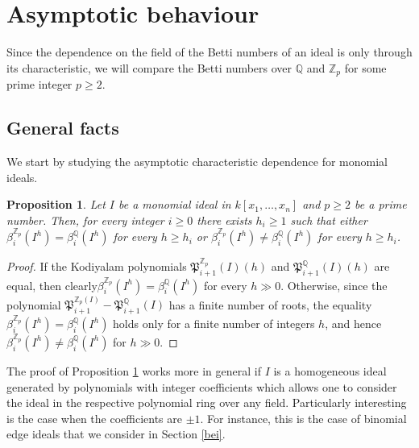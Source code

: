 \documentclass[11pt,oneside]{amsart}
\theoremstyle{plain}
\newtheorem{proposition}[theorem]{Proposition}
\theoremstyle{definition}
\newcommand{\Q}{\mathbb{Q}}
\newcommand{\Z}{\mathbb{Z}}
\newcommand{\mf}{\mathfrak}
\begin{document}
\section{Asymptotic behaviour}\label{S.asymptoticBehaviour}

Since the dependence on the field of the Betti numbers of an ideal is only through its characteristic, we will compare the Betti numbers over $\Q$ and $\Z_p$ for some prime integer $p \geq 2$. 



\subsection{General facts} 
We start by studying the asymptotic characteristic dependence for monomial ideals.

\begin{proposition}\label{P.KodiyalamPolynomials}
Let $I$ be a monomial ideal in $k[x_1,\dots,x_n]$ and $p \geq 2$ be a prime number. Then, for every integer $i \geq 0$ there exists $h_i \geq 1$ such that either $\beta^{\Z_p}_i(I^h)=\beta^{\Q}_i(I^h)$ for every $h\geq h_i$ or $\beta^{\Z_p}_i(I^h) \neq \beta^{\Q}_i(I^h)$ for every $h\geq h_i$.
\end{proposition}

\begin{proof}
If the Kodiyalam polynomials $\mf P_{i+1}^{\Z_p}(I)(h)$ and $\mf P_{i+1}^{\Q}(I)(h)$ are equal, then clearly\break $\beta_i^{\Z_p}(I^h)=\beta_i^{\Q}(I^h)$ for every $h\gg 0$. Otherwise, since the polynomial $\mf P_{i+1}^{\Z_p(I)} - \mf P_{i+1}^{\Q}(I)$ has a finite number of roots, the equality $\beta_i^{\Z_p}(I^h) = \beta_i^{\Q}(I^h)$ holds only for a finite number of integers $h$, and hence $\beta_i^{\Z_p}(I^h)\neq\beta_i^{\Q}(I^h)$ for $h \gg 0$.
\end{proof}

The proof of Proposition \ref{P.KodiyalamPolynomials} works more in general if $I$ is a homogeneous ideal generated by polynomials with integer coefficients which allows one to consider the ideal in the respective polynomial ring over 
any field. Particularly interesting is the case when the coefficients 
are $\pm 1$. For instance, this is the case of binomial edge ideals that we consider in Section \ref{bei}. 
\end{document}
